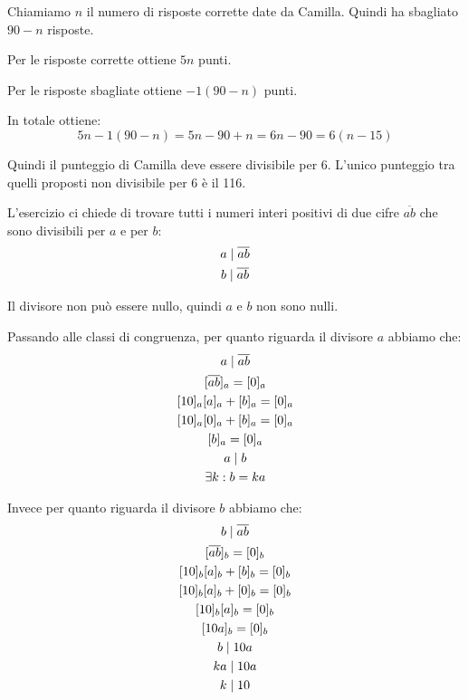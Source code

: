 \begin{soluzione}
    Chiamiamo $n$ il numero di risposte corrette date da Camilla.
    Quindi ha sbagliato $90 - n$ risposte.

    Per le risposte corrette ottiene $5n$ punti.

    Per le risposte sbagliate ottiene $-1(90-n)$ punti.

    In totale ottiene:
    \[
        5n - 1(90 - n) = 5n - 90 + n = 6n - 90 = 6(n - 15)
    \]

    Quindi il punteggio di Camilla deve essere divisibile per 6.
    L'unico punteggio tra quelli proposti non divisibile per 6 è il 116.
\end{soluzione}

\begin{soluzione}
    L'esercizio ci chiede di trovare tutti i numeri interi positivi di due cifre $\overline{ab}$ che sono divisibili
    per $a$ e per $b$:
    \begin{gather*}
        a  \mid  \overline{ab} \\
        b  \mid  \overline{ab}
    \end{gather*}

    Il divisore non può essere nullo, quindi $a$ e $b$ non sono nulli.

    Passando alle classi di congruenza, per quanto riguarda il divisore $a$ abbiamo che:
    \begin{gather*}
        a  \mid  \overline{ab} \\
        [\overline{ab}]_a = [0]_a \\
        [10]_a[a]_a + [b]_a = [0]_a \\
        [10]_a[0]_a + [b]_a = [0]_a \\
        [b]_a = [0]_a \\
        a  \mid  b \\
        \exists k : b = ka
    \end{gather*}

    Invece per quanto riguarda il divisore $b$ abbiamo che:
    \begin{gather*}
        b  \mid  \overline{ab} \\
        [\overline{ab}]_b = [0]_b \\
        [10]_b[a]_b + [b]_b = [0]_b \\
        [10]_b[a]_b + [0]_b = [0]_b \\
        [10]_b[a]_b = [0]_b \\
        [10a]_b = [0]_b \\
        b  \mid  10a \\
        ka  \mid  10a \\
        k  \mid  10
    \end{gather*}


\end{soluzione}
